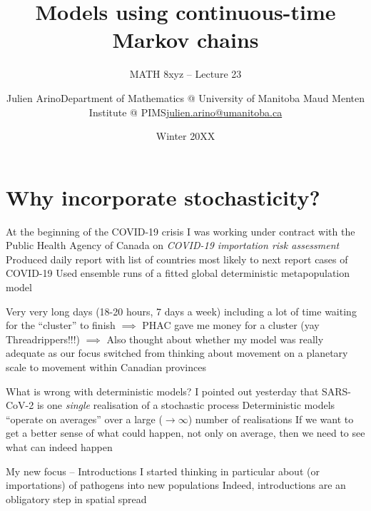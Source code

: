 \documentclass[aspectratio=169]{beamer}\usepackage[]{graphicx}\usepackage[]{xcolor}
\subtitle{MATH 8xyz -- Lecture 23}
\author{\texorpdfstring{Julien Arino\newline Department of Mathematics @ University of Manitoba \newline Maud Menten Institute @ PIMS\newline\url{julien.arino@umanitoba.ca}}{Julien Arino}}
\date{Winter 20XX}
\title{Models using continuous-time Markov chains}
\begin{document}


\section{Why incorporate stochasticity?}

\begin{frame}{At the beginning of the COVID-19 crisis}
\bbullet 
I was working under contract with the Public Health Agency of Canada on \emph{COVID-19 importation risk assessment}
\vfill
\bbullet 
Produced daily report with list of countries most likely to next report cases of COVID-19
\vfill
\bbullet
Used ensemble runs of a fitted global deterministic metapopulation model
\end{frame}


\begin{frame}
\bbullet Very very long days (18-20 hours, 7 days a week)
\vfill
\bbullet including a lot of time waiting for the ``cluster'' to finish
\vfill
$\implies$ PHAC gave me money for a cluster (yay Threadrippers!!!)
\vfill
$\implies$ Also thought about whether my model was really adequate as our focus switched from thinking about movement on a planetary scale to movement within Canadian provinces
\end{frame}

\begin{frame}{What is wrong with deterministic models?}
\bbullet I pointed out yesterday that SARS-CoV-2 is one \emph{single} realisation of a stochastic process
\vfill
\bbullet Deterministic models ``operate on averages'' over a large ($\to\infty$) number of realisations
\vfill
\bbullet If we want to get a better sense of what could happen, not only on average, then we need to see what can indeed happen
\end{frame}

\begin{frame}{My new focus -- Introductions}
\bbullet I started thinking in particular about  (or importations) of pathogens into new populations
\vfill
\bbullet Indeed, introductions are an obligatory step in spatial spread
\end{frame}
\end{document}
